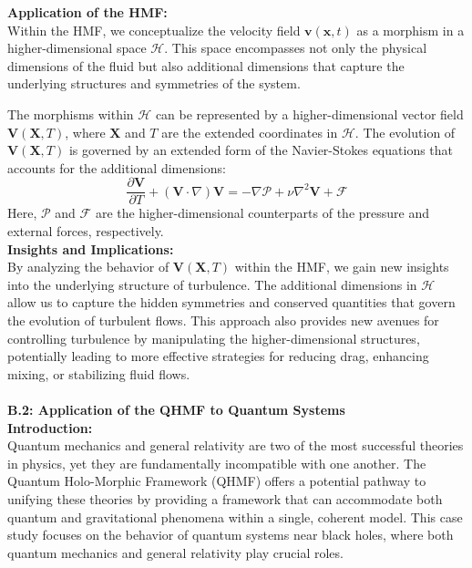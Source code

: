 \documentclass{article}
\begin{document}
\textbf{Application of the HMF:}
\\

Within the HMF, we conceptualize the velocity field \( \mathbf{v}(\mathbf{x}, t) \) as a morphism in a higher-dimensional space \( \mathcal{H} \). This space encompasses not only the physical dimensions of the fluid but also additional dimensions that capture the underlying structures and symmetries of the system.

The morphisms within \( \mathcal{H} \) can be represented by a higher-dimensional vector field \( \mathbf{V}(\mathbf{X}, T) \), where \( \mathbf{X} \) and \( T \) are the extended coordinates in \( \mathcal{H} \). The evolution of \( \mathbf{V}(\mathbf{X}, T) \) is governed by an extended form of the Navier-Stokes equations that accounts for the additional dimensions:
\[
\frac{\partial \mathbf{V}}{\partial T} + (\mathbf{V} \cdot \nabla) \mathbf{V} = -\nabla \mathcal{P} + \nu \nabla^2 \mathbf{V} + \mathcal{F}
\]
Here, \( \mathcal{P} \) and \( \mathcal{F} \) are the higher-dimensional counterparts of the pressure and external forces, respectively.
\\

\textbf{Insights and Implications:}
\\

By analyzing the behavior of \( \mathbf{V}(\mathbf{X}, T) \) within the HMF, we gain new insights into the underlying structure of turbulence. The additional dimensions in \( \mathcal{H} \) allow us to capture the hidden symmetries and conserved quantities that govern the evolution of turbulent flows. This approach also provides new avenues for controlling turbulence by manipulating the higher-dimensional structures, potentially leading to more effective strategies for reducing drag, enhancing mixing, or stabilizing fluid flows.
\\
\\

\textbf{B.2: Application of the QHMF to Quantum Systems}
\\

\textbf{Introduction:}
\\

Quantum mechanics and general relativity are two of the most successful theories in physics, yet they are fundamentally incompatible with one another. The Quantum Holo-Morphic Framework (QHMF) offers a potential pathway to unifying these theories by providing a framework that can accommodate both quantum and gravitational phenomena within a single, coherent model. This case study focuses on the behavior of quantum systems near black holes, where both quantum mechanics and general relativity play crucial roles.
\\
\end{document}
